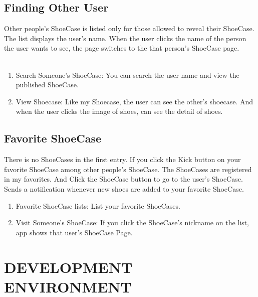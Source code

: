 \documentclass[conference]{IEEEtran}
\begin{document}
\subsection{Finding Other User}

Other people's ShoeCase is listed only for those allowed to reveal their ShoeCase. The list displays the user's name. When the user clicks the name of the person the user wants to see, the page switches to the that person's ShoeCase page.
\\\\
\begin{enumerate}
	\item Search Someone's ShoeCase: You can search the user name and view the published ShoeCase.
\\
	\item View Shoecase: Like my Shoecase, the user can see the other's shoecase. And when the user clicks the image of shoes, can see the detail of shoes. 
\\
\end{enumerate}

\subsection{Favorite ShoeCase}

There is no ShoeCases in the first entry. If you click the Kick button on your favorite ShoeCase among other people's ShoeCase. The ShoeCases are registered in my favorites. And Click the ShoeCase button to go to the user's ShoeCase. Sends a notification whenever new shoes are added to your favorite ShoeCase. 
\\
\begin{enumerate}
	\item Favorite ShoeCase lists: List your favorite ShoeCases.
	\\
	\item Visit Someone's ShoeCase: If you click the ShoeCase's nickname on the list, app shows that user's ShoeCase Page. 
\\
\end{enumerate}

\section{DEVELOPMENT ENVIRONMENT}
\end{document}
